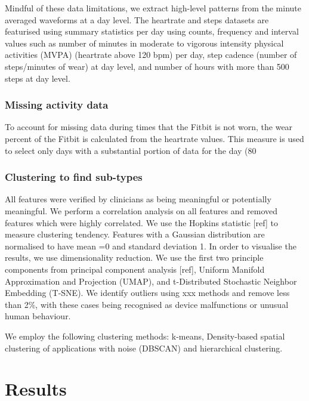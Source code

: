 \documentclass{article}
\begin{document}
Mindful of these data limitations, we extract high-level patterns from the minute averaged waveforms at a day level. The heartrate and steps datasets are featurised using summary statistics per day using counts, frequency and interval values such as number of minutes in moderate to vigorous intensity physical activities (MVPA) (heartrate above 120 bpm) per day, step cadence (number of steps/minutes of wear) at day level, and number of hours with more than 500 steps at day level. 


\subsubsection{Missing activity data}

To account for missing data during times that the Fitbit is not worn, the wear percent of the Fitbit is calculated from the heartrate values. This measure is used to select only days with a substantial portion of data for the day (80%

\subsubsection{Clustering to find sub-types}  

All features were verified by clinicians as being meaningful or potentially meaningful. We perform a correlation analysis on all features and removed features which were highly correlated. We use the Hopkins statistic [ref] to measure clustering tendency. Features with a Gaussian distribution are normalised to have mean =0 and standard deviation 1. In order to visualise the results, we use dimensionality reduction. We use the first two principle components from principal component analysis [ref], Uniform Manifold Approximation and Projection (UMAP), and t-Distributed Stochastic Neighbor Embedding (T-SNE). We identify outliers using xxx methods and remove less than 2\%, with these cases being recognised as device malfunctions or unusual human behaviour.  

We employ the following clustering methods: k-means, Density-based spatial clustering of applications with noise (DBSCAN) and hierarchical clustering.  

\section{Results}
\end{document}
